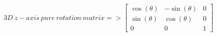 \documentclass[12 pt]{slides}
\begin{document}
\begingroup
\[3D\ z-axis\ pure\ rotation\ matrix => \begin{bmatrix}\cos(\theta)  & -\sin(\theta) & 0\\
                                                       \sin(\theta)  & \cos(\theta) & 0 \\ 
                                                       0 & 0 & 1\end{bmatrix}\]
\endgroup
\end{document}
